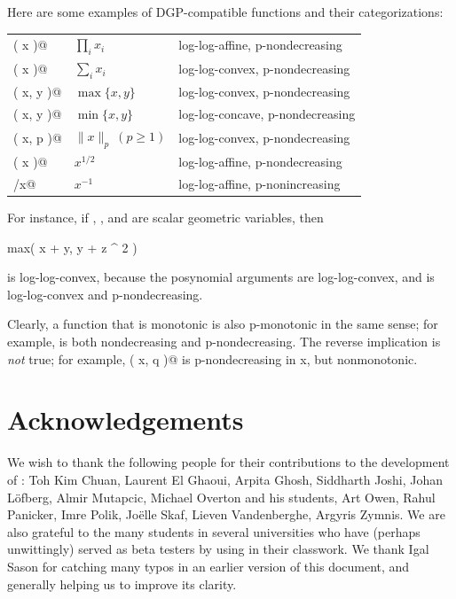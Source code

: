 \documentclass[12pt]{article}
\begin{document}
Here are some examples of DGP-compatible functions and their categorizations:
\begin{center}
\begin{tabular}{lll}
	\verb@prod( x )@    & $\prod_i x_i$& log-log-affine,  p-nondecreasing \\
	\verb@sum( x )@     & $\sum_i x_i$ & log-log-convex,  p-nondecreasing \\
	\verb@max( x, y )@  & $\max\{x,y\}$ & log-log-convex, p-nondecreasing \\
	\verb@min( x, y )@  & $\min\{x,y\}$ & log-log-concave, p-nondecreasing \\
	\verb@norm( x, p )@ & $\|x\|_p~(p\geq 1)$ & log-log-convex,  p-nondecreasing \\ 
	\verb@sqrt( x )@    & $x^{1/2}$    & log-log-affine, p-nondecreasing \\
	\verb@1/x@          & $x^{-1}$     & log-log-affine, p-nonincreasing
\end{tabular}
\end{center}
For instance, if \verb@x@, \verb@y@, and \verb@z@ are scalar geometric variables, then
\begin{code}
	max( x + y, y + z ^ 2 )
\end{code}
is log-log-convex, because the posynomial arguments are log-log-convex, and \verb@max@ is log-log-convex
and p-nondecreasing. 

Clearly, a function that is monotonic is also p-monotonic in the same sense;
for example, \verb@sum@ is both nondecreasing and p-nondecreasing. The
reverse implication is \emph{not} true; for example,
\verb@norm( x, q )@ is p-nondecreasing in x, but nonmonotonic.
\fi

\section{Acknowledgements}

We wish to thank the following people for their contributions to
the development of \cvx: Toh Kim Chuan, Laurent El Ghaoui, Arpita Ghosh, 
Siddharth Joshi, Johan L\"{o}fberg, Almir Mutapcic, Michael Overton
and his students, Art Owen, Rahul Panicker, Imre Polik, Jo\"{e}lle Skaf, 
Lieven Vandenberghe, Argyris Zymnis. We are also grateful to the many
students in several universities who have (perhaps unwittingly)
served as beta testers by using \cvx in their classwork.
We thank Igal Sason for catching many typos in an earlier version of this 
document, and generally helping us to improve its clarity.

\newpage

\newpage
\printindex
\end{document}
